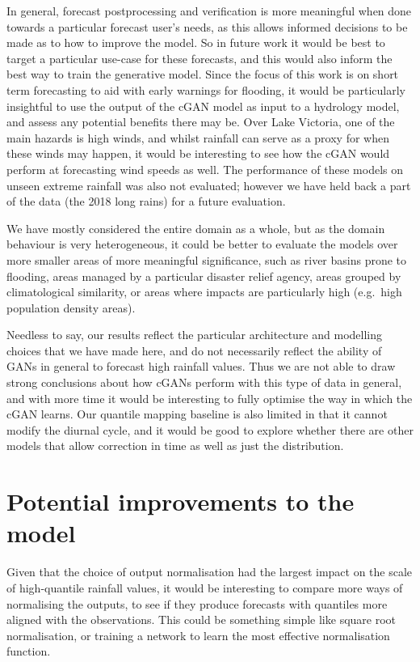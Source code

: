 \documentclass[../main.tex]{subfiles}
\begin{document}
In general, forecast postprocessing and verification is more meaningful when done towards a particular forecast user's needs, as this allows informed decisions to be made as to how to improve the model. So in future work it would be best to target a particular use-case for these forecasts, and this would also inform the best way to train the generative model. Since the focus of this work is on short term forecasting to aid with early warnings for flooding, it would be particularly insightful to use the output of the cGAN model as input to a hydrology model, and assess any potential benefits there may be. Over Lake Victoria, one of the main hazards is high winds, and whilst rainfall can serve as a proxy for when these winds may happen, it would be interesting to see how the cGAN would perform at forecasting wind speeds as well. The performance of these models on unseen extreme rainfall was also not evaluated; however we have held back a part of the data (the 2018 long rains) for a future evaluation.

We have mostly considered the entire domain as a whole, but as the domain behaviour is very heterogeneous, it could be better to evaluate the models over more smaller areas of more meaningful significance, such as river basins prone to flooding, areas managed by a particular disaster relief agency, areas grouped by climatological similarity, or areas where impacts are particularly high (e.g.~high population density areas). 

Needless to say, our results reflect the particular architecture and modelling choices that we have made here, and do not necessarily reflect the ability of GANs in general to forecast high rainfall values. Thus we are not able to draw strong conclusions about how cGANs perform with this type of data in general, and with more time it would be interesting to fully optimise the way in which the cGAN learns. Our quantile mapping baseline is also limited in that it cannot modify the diurnal cycle, and it would be good to explore whether there are other models that allow correction in time as well as just the distribution.

\section{Potential improvements to the model}



Given that the choice of output normalisation had the largest impact on the scale of high-quantile rainfall values, it would be interesting to compare more ways of normalising the outputs, to see if they produce forecasts with quantiles more aligned with the observations. This could be something simple like square root normalisation, or training a network to learn the most effective normalisation function. 
\end{document}
